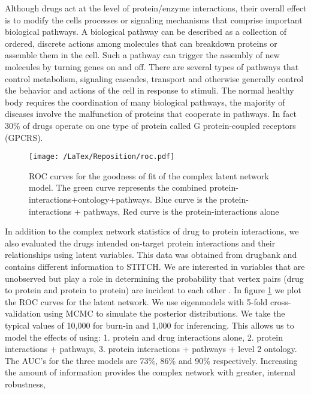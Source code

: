 \documentclass[preprint,11pt]{elsarticle}
\begin{document}
Although drugs act at the level of protein/enzyme interactions, their overall effect is to modify the cells processes or signaling mechanisms that comprise important biological pathways. A biological pathway can be described as a collection of ordered, discrete actions among molecules that can breakdown proteins or assemble them in the cell. Such a pathway can trigger the assembly of new molecules by turning genes on and off. There are several types of pathways that control metabolism, signaling cascades, transport and otherwise generally control the behavior and actions of the cell in response to stimuli. The normal healthy body requires the coordination of many biological pathways, the majority of diseases involve the malfunction of proteins that cooperate in pathways. In fact 30\% of drugs operate on one type of protein called G protein-coupled receptors (GPCRS). 

\begin{figure}[h]
  \begin{center}
	\centering \texttt{[image: /LaTex/Reposition/roc.pdf]} %
  \end{center}
\centering \caption{ROC curves for the goodness of fit of the complex latent network model. The green curve represents the combined protein-interactions+ontology+pathways. Blue curve is the protein-interactions + pathways, Red curve is the protein-interactions alone}
\label{roc}
\end{figure}

In addition to the complex network statistics of drug to protein interactions, we also evaluated the drugs intended on-target protein interactions and their relationships using latent variables. This data was obtained from drugbank and contains different information to STITCH. We are interested in variables that are unobserved but play a role in determining the probability that vertex pairs (drug to protein and protein to protein) are incident to each other \cite{Kolaczyk2014} . In figure \ref{roc} we plot the ROC curves for the latent network. We use eigenmodels with 5-fold cross-validation using MCMC to simulate the posterior distributions. We take the typical values of 10,000 for burn-in and 1,000 for inferencing. This allows us to model the effects of using: 1. protein and drug interactions alone, 2. protein interactions + pathways, 3. protein interactions + pathways + level  2 ontology. The AUC's for the three models are 73\%, 86\% and 90\% respectively. Increasing the amount of information provides the complex network with greater, internal robustness, 
\end{document}

